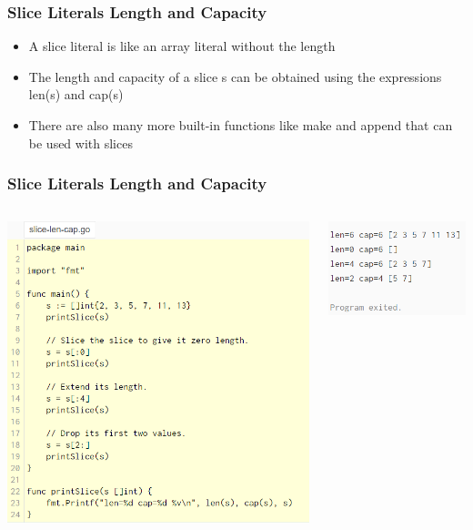 \documentclass[14pt]{beamer}
\begin{document}
{
\begin{frame}
    \frametitle{Slice Literals Length and Capacity}
    \begin{itemize}
        \item A slice literal is like an array literal without the length
        \item The length and capacity of a slice s can be obtained using the expressions len(s) and cap(s)
        \item There are also many more built-in functions like make and append that can be used with slices
    \end{itemize}
\end{frame}
}

{
\begin{frame}
    \frametitle{Slice Literals Length and Capacity}
    \begin{columns}
        \begin{column}{0.6\textwidth}
            \includegraphics[width=\linewidth]{img/slicelencap.PNG}
        \end{column}
        \begin{column}{0.4\textwidth}
            \includegraphics[width=\linewidth]{img/slicelencapoutput.PNG}

\end{column}
\end{columns}
\end{frame}}
\end{document}
